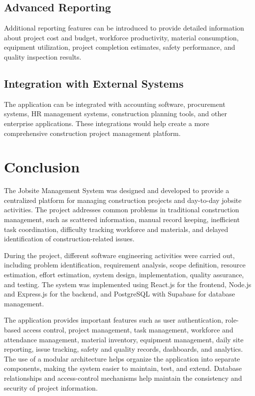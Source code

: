 \documentclass[11pt,a4paper]{article}
\begin{document}
\subsection{Advanced Reporting}
Additional reporting features can be introduced to provide detailed information about project cost and budget, workforce productivity, material consumption, equipment utilization, project completion estimates, safety performance, and quality inspection results.

\subsection{Integration with External Systems}
The application can be integrated with accounting software, procurement systems, HR management systems, construction planning tools, and other enterprise applications. These integrations would help create a more comprehensive construction project management platform.

\section{Conclusion}
The Jobsite Management System was designed and developed to provide a centralized platform for managing construction projects and day-to-day jobsite activities. The project addresses common problems in traditional construction management, such as scattered information, manual record keeping, inefficient task coordination, difficulty tracking workforce and materials, and delayed identification of construction-related issues.

During the project, different software engineering activities were carried out, including problem identification, requirement analysis, scope definition, resource estimation, effort estimation, system design, implementation, quality assurance, and testing. The system was implemented using React.js for the frontend, Node.js and Express.js for the backend, and PostgreSQL with Supabase for database management.

The application provides important features such as user authentication, role-based access control, project management, task management, workforce and attendance management, material inventory, equipment management, daily site reporting, issue tracking, safety and quality records, dashboards, and analytics. The use of a modular architecture helps organize the application into separate components, making the system easier to maintain, test, and extend. Database relationships and access-control mechanisms help maintain the consistency and security of project information.
\end{document}
